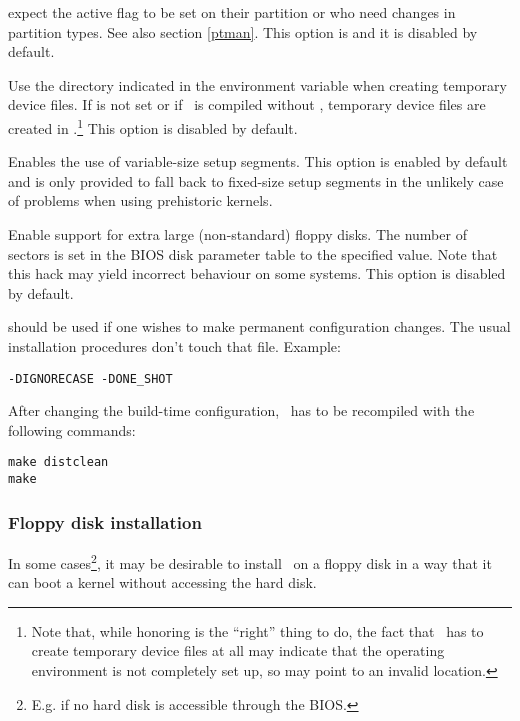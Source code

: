 \begin{description}
    expect the active flag to be set on their partition or who need changes
    in partition types. See also section
    \ref{ptman}. This option is  and it is disabled by
    default.
  \item[\raw{USE\_TMPDIR}] Use the directory indicated in the 
    environment variable when creating temporary device files. If 
    is not set or if \LILO\ is compiled without , temporary
    device files are created in .\footnote{Note that, while honoring
     is the ``right'' thing to do, the fact that \LILO\ has to
    create temporary device files at all may indicate that the operating
    environment is not completely set up, so  may point to an
    invalid location.} This option is disabled by default.
  \item[\raw{VARSETUP}] Enables the use of variable-size setup segments.
    This option is enabled by default and is only provided to fall back to
    fixed-size setup segments in the unlikely case of problems when using
    prehistoric kernels.
  \item[\raw{XL\_SECS=\meta{sectors}}] Enable support for extra large
    (non-standard) floppy disks. The number of sectors is set in the BIOS
    disk parameter table to the specified value. Note that this hack may
    yield incorrect behaviour on some systems. This option is disabled by
    default.
\end{description}

 should be used if one wishes to make
permanent configuration changes. The usual installation procedures don't
touch that file. Example:

\begin{verbatim}
-DIGNORECASE -DONE_SHOT
\end{verbatim}

After changing the build-time configuration, \LILO\ has to be recompiled
with the following commands:

\begin{verbatim}
make distclean
make
\end{verbatim}


\subsubsection{Floppy disk installation}

In some cases\footnote{E.g. if no hard disk is accessible through the BIOS.},
it may be desirable to install \LILO\ on a floppy disk in a way that it can
boot a kernel without accessing the hard disk.

